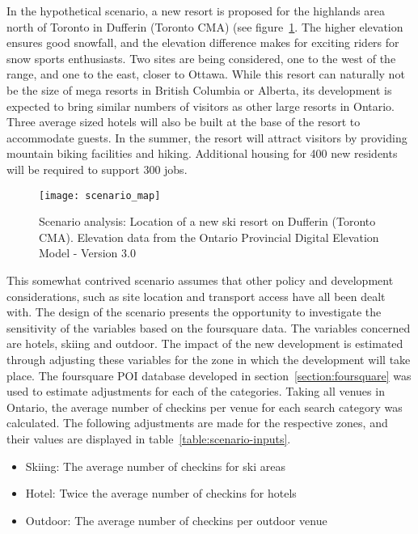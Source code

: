 In the hypothetical scenario, a new resort is proposed for the highlands area north of Toronto  in Dufferin (Toronto CMA) (see figure~\ref{fig:scenario-map}. The higher elevation ensures good snowfall, and the elevation difference makes for exciting riders for snow sports enthusiasts. Two sites are being considered, one to the west of the range, and one to the east, closer to Ottawa. While this resort can naturally not be the size of mega resorts in British Columbia or Alberta, its development is expected to bring similar numbers of visitors as other large resorts in Ontario. Three average sized hotels will also be built at the base of the resort to accommodate guests. In the summer, the resort will attract visitors by providing mountain biking facilities and hiking. Additional housing for 400 new residents will be required to support 300 jobs.

\begin{figure}[H]
\centering
\texttt{[image: scenario\_map]}
\caption{Scenario analysis: Location of a new ski resort on Dufferin (Toronto CMA). Elevation data from the Ontario Provincial Digital Elevation Model - Version 3.0 }
\label{fig:scenario-map}
\end{figure}

This somewhat contrived scenario assumes that other policy and development considerations, such as site location and transport access have all been dealt with. The design of the scenario presents the opportunity to investigate the sensitivity of the  variables based on the foursquare data. The variables concerned are hotels, skiing and outdoor. The impact of the new development is estimated through adjusting these variables for the zone in which the development will take place. The foursquare POI database developed in section~\ref{section:foursquare} was used to estimate adjustments for each of the categories. Taking all venues in Ontario, the average number of checkins per venue for each search category was calculated. The following adjustments are made for the respective zones, and their values are displayed in table~\ref{table:scenario-inputs}.

\begin{minipage}{\textwidth}
\begin{itemize}
\item Skiing: The average number of checkins for ski areas
\item Hotel: Twice the average number of checkins for hotels
\item Outdoor: The average number of checkins per outdoor venue
\end{itemize}
\end{minipage}


